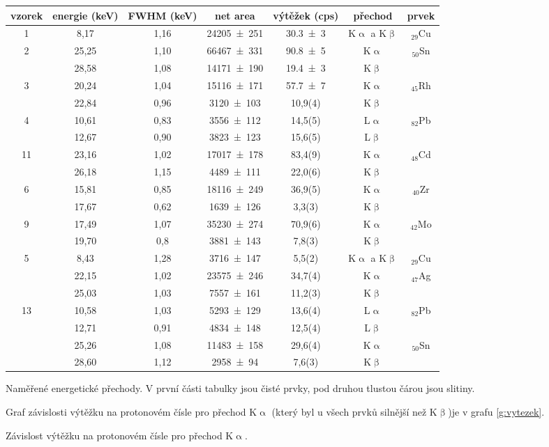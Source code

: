 \begin{tabulka}[htbp]
\centering
\begin{tabular}{c||ccccc|c}
vzorek & energie (\si{\keV}) & FWHM (\si{\keV}) & net area & výtěžek (cps) & přechod & prvek \\ \hline\hline

1 & 8,17 & 1,16 & \num{24205(251)} & \num{30,3(3)} & K$\upalpha$ a K$\upbeta$ & $_{29}$Cu \\  \hline
\multirow{2}{*}{2} & 25,25 & 1,10 & \num{66467(331)} & \num{90,8(5)} & K$\upalpha$ & \multirow{2}{*}{$_{50}$Sn} \\
 & 28,58 & 1,08 & \num{14171(190)} & \num{19,4(3)} & K$\upbeta$ &  \\ \hline
\multirow{2}{*}{3} & 20,24 & 1,04 & \num{15116(171)} & \num{57,7(7)} & K$\upalpha$ & \multirow{2}{*}{$_{45}$Rh} \\ 
 & 22,84 & 0,96 & \num{3120(103)} & 10,9(4) & K$\upbeta$ & \\ \hline
\multirow{2}{*}{4} & 10,61 & 0,83 & \num{3556(112)} & 14,5(5) & L$\upalpha$ & \multirow{2}{*}{$_{82}$Pb} \\ 
 & 12,67 & 0,90 & \num{3823(123)} & 15,6(5) & L$\upbeta$ & \\ \hline
\multirow{2}{*}{11} & 23,16 & 1,02 & \num{17017(178)} & 83,4(9) & K$\upalpha$ & \multirow{2}{*}{$_{48}$Cd} \\ 
 & 26,18 & 1,15 & \num{4489(111)} & 22,0(6) & K$\upbeta$ & \\ \hline
\multirow{2}{*}{6} & 15,81 & 0,85 & \num{18116(249)} & 36,9(5) & K$\upalpha$ & \multirow{2}{*}{$_{40}$Zr} \\
 & 17,67 & 0,62 & \num{1639(126)} & 3,3(3) & K$\upbeta$ &  \\ \hline
\multirow{2}{*}{9} & 17,49 & 1,07 & \num{35230(274)} & 70,9(6) & K$\upalpha$ & \multirow{2}{*}{$_{42}$Mo} \\ 
 & 19,70 & 0,8 & \num{3881(143)} & 7,8(3) & K$\upbeta$ &  \\ \hline\hline
\multirow{3}{*}{5} & 8,43 & 1,28 & \num{3716(147)} & 5,5(2) & K$\upalpha$ a K$\upbeta$ & $_{29}$Cu \\
 & 22,15 & 1,02 & \num{23575(246)} & 34,7(4) & K$\upalpha$ & \multirow{2}{*}{$_{47}$Ag} \\
 & 25,03 & 1,03 & \num{7557(161)} & 11,2(3) & K$\upbeta$ & \\ \hline
\multirow{4}{*}{13} & 10,58 & 1,03 & \num{5293(129)} & 13,6(4) & L$\upalpha$ & \multirow{2}{*}{$_{82}$Pb} \\ 
 & 12,71 & 0,91 & \num{4834(148)} & 12,5(4) & L$\upbeta$ &  \\
 & 25,26 & 1,08 & \num{11483(158)} & 29,6(4) & K$\upalpha$ & \multirow{2}{*}{$_{50}$Sn} \\
 & 28,60 & 1,12 & \num{2958(94)} & 7,6(3) & K$\upbeta$ &  \\ 
\end{tabular}
\caption{Naměřené energetické přechody. V první části tabulky jsou čisté prvky, pod druhou tlustou čárou jsou slitiny.}
\label{t:merenivzorky}
\end{tabulka}

Graf závislosti výtěžku na protonovém čísle pro přechod K$\upalpha$ (který byl u všech prvků silnější než K$\upbeta$)je v grafu \ref{g:vytezek}.

\begin{graph}[htbp] 
\centering
%
\caption{Závislost výtěžku na protonovém čísle pro přechod K$\upalpha$.}
\label{g:vytezek}
\end{graph}